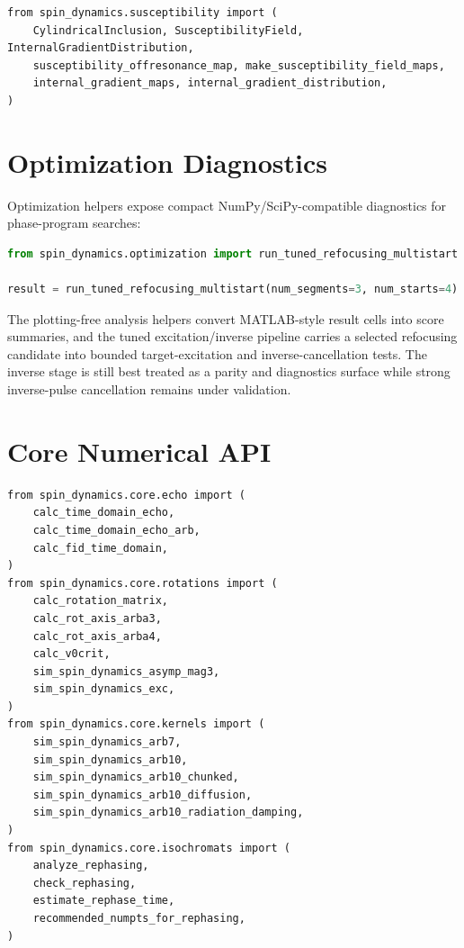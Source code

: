 \documentclass[11pt,oneside]{report}
\begin{document}
\begin{lstlisting}
from spin_dynamics.susceptibility import (
    CylindricalInclusion, SusceptibilityField, InternalGradientDistribution,
    susceptibility_offresonance_map, make_susceptibility_field_maps,
    internal_gradient_maps, internal_gradient_distribution,
)
\end{lstlisting}

\section{Optimization Diagnostics}

Optimization helpers expose compact NumPy/SciPy-compatible diagnostics for
phase-program searches:

\begin{lstlisting}[language=Python]
from spin_dynamics.optimization import run_tuned_refocusing_multistart

result = run_tuned_refocusing_multistart(num_segments=3, num_starts=4)
\end{lstlisting}

The plotting-free analysis helpers convert MATLAB-style result cells into
score summaries, and the tuned excitation/inverse pipeline carries a selected
refocusing candidate into bounded target-excitation and inverse-cancellation
tests. The inverse stage is still best treated as a parity and diagnostics
surface while strong inverse-pulse cancellation remains under validation.

\section{Core Numerical API}

\begin{lstlisting}
from spin_dynamics.core.echo import (
    calc_time_domain_echo,
    calc_time_domain_echo_arb,
    calc_fid_time_domain,
)
from spin_dynamics.core.rotations import (
    calc_rotation_matrix,
    calc_rot_axis_arba3,
    calc_rot_axis_arba4,
    calc_v0crit,
    sim_spin_dynamics_asymp_mag3,
    sim_spin_dynamics_exc,
)
from spin_dynamics.core.kernels import (
    sim_spin_dynamics_arb7,
    sim_spin_dynamics_arb10,
    sim_spin_dynamics_arb10_chunked,
    sim_spin_dynamics_arb10_diffusion,
    sim_spin_dynamics_arb10_radiation_damping,
)
from spin_dynamics.core.isochromats import (
    analyze_rephasing,
    check_rephasing,
    estimate_rephase_time,
    recommended_numpts_for_rephasing,
)
\end{lstlisting}
\end{document}
